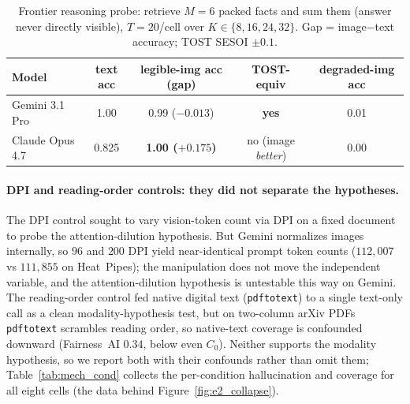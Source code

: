 \documentclass[11pt]{article}
\begin{document}
\begin{table}[h]
\small\centering
\caption{Frontier reasoning probe: retrieve $M{=}6$ packed facts and sum them (answer never directly visible), $T{=}20$/cell over $K\in\{8,16,24,32\}$. Gap = image$-$text accuracy; TOST SESOI $\pm 0.1$.}
\label{tab:e9}
\begin{tabular}{lcccc}
\toprule
Model & text acc & legible-img acc (gap) & TOST-equiv & degraded-img acc \\
\midrule
Gemini 3.1 Pro  & 1.00  & 0.99 ($-0.013$) & \textbf{yes} & 0.01 \\
Claude Opus 4.7 & 0.825 & \textbf{1.00 ($+0.175$)} & no (image \emph{better}) & 0.00 \\
\bottomrule
\end{tabular}
\end{table}

\paragraph{DPI and reading-order controls: they did not separate the hypotheses.}
The DPI control sought to vary vision-token count via DPI on a fixed document to probe the attention-dilution hypothesis. But Gemini normalizes images internally, so $96$ and $200$ DPI yield near-identical prompt token counts ($112{,}007$ vs $111{,}855$ on Heat~Pipes); the manipulation does not move the independent variable, and the attention-dilution hypothesis is untestable this way on Gemini. The reading-order control fed native digital text (\texttt{pdftotext}) to a single text-only call as a clean modality-hypothesis test, but on two-column arXiv PDFs \texttt{pdftotext} scrambles reading order, so native-text coverage is confounded downward (Fairness~AI $0.34$, below even $C_0$). Neither supports the modality hypothesis, so we report both with their confounds rather than omit them; Table~\ref{tab:mech_cond} collects the per-condition hallucination and coverage for all eight cells (the data behind Figure~\ref{fig:e2_collapse}).
\end{document}
